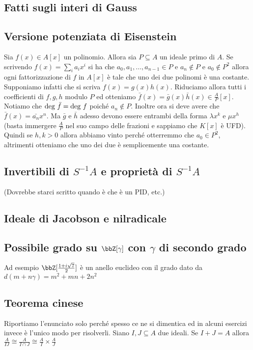 \documentclass[a4paper,NoNotes,GeneralMath]{stdmdoc}
\begin{document}
	\subsection{Fatti sugli interi di Gauss}
	
	\subsection{Versione potenziata di Eisenstein}
	Sia $f(x) \in A[x]$ un polinomio. Allora sia $P \subseteq A$ un ideale primo di $A$. Se scrivendo $f(x) = \sum_i a_i x^i$ si ha che $a_0, a_1, \ldots, a_{n-1} \in P$ e $a_n \not\in P$ e $a_0 \not\in P^2$ allora ogni fattorizzazione di $f$ in $A[x]$ è tale che uno dei due polinomi è una costante. \\
	Supponiamo infatti che si scriva $f(x) = g(x)h(x)$. Riduciamo allora tutti i coefficienti di $f, g, h$ modulo $P$ ed otteniamo $\bar{f}(x) = \bar{g}(x) \bar{h}(x) \in \frac{A}{P}[x]$. Notiamo che $\mbox{deg } \bar{f} = \mbox{deg } f$ poiché $a_n \not\in P$. Inoltre ora si deve avere che $\bar{f}(x) = \bar{a_n} x^n$. Ma $\bar{g}$ e $\bar{h}$ adesso devono essere entrambi della forma $\lambda x^k$ e $\mu x^h$ (basta immergere $\frac{A}{P}$ nel suo campo delle frazioni e sappiamo che $K[x]$ è UFD). Quindi se $h,k>0$ allora abbiamo vinto perché otterremmo che $a_0 \in P^2$, altrimenti otteniamo che uno dei due è semplicemente una costante.
	
	\subsection{Invertibili di $S^{-1}A$ e proprietà di $S^{-1}A$}
	(Dovrebbe starci scritto quando è che è un PID, etc.)
	
	\subsection{Ideale di Jacobson e nilradicale}
	
	\subsection{Possibile grado su $\bbZ[\gamma]$ con $\gamma$ di secondo grado}
	Ad esempio $\bbZ[\frac{1+i\sqrt{7}}{2}]$ è un anello euclideo con il grado dato da $d(m+n\gamma) = m^2 + mn + 2n^2$
	
	\subsection{Teorema cinese}
	Riportiamo l'enunciato solo perché spesso ce ne si dimentica ed in alcuni esercizi invece è l'unico modo per risolverli. Siano $I, J \subseteq A$ due ideali. Se $I + J = A$ allora $\frac{A}{IJ} \cong \frac{A}{I \cap J} \cong \frac{A}{I} \times \frac{A}{J}$
	
\end{document}
